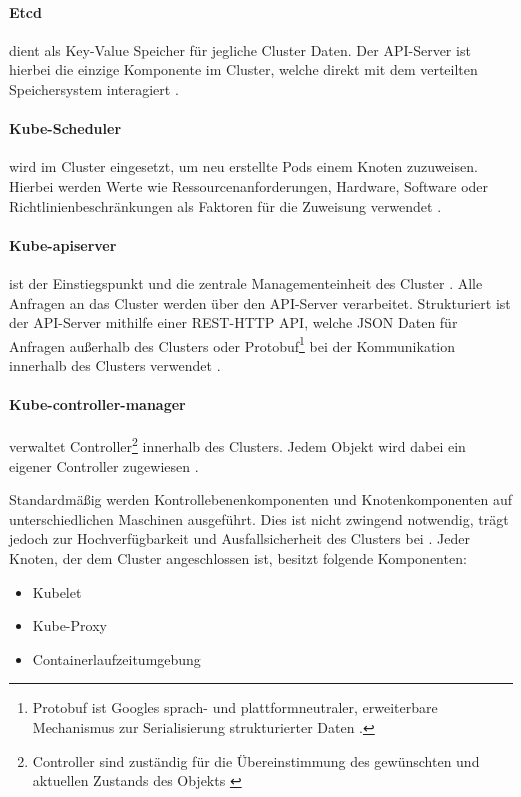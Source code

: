 \paragraph{Etcd} dient als Key-Value Speicher für jegliche Cluster Daten.
Der API-Server ist hierbei die einzige Komponente im Cluster, welche direkt mit dem verteilten Speichersystem interagiert \cite{Hausenblas2019}.

\paragraph{Kube-Scheduler} wird im Cluster eingesetzt, um neu erstellte Pods einem Knoten zuzuweisen.
Hierbei werden Werte wie Ressourcenanforderungen, Hardware, Software oder Richtlinienbeschränkungen 
als Faktoren für die Zuweisung verwendet \cite{kubernetesComponents}.

\paragraph{Kube-apiserver} ist der Einstiegspunkt und die zentrale Managementeinheit des Cluster \cite{Hausenblas2019}. 
Alle Anfragen an das Cluster werden über den API-Server verarbeitet.
Strukturiert ist der API-Server mithilfe einer REST-HTTP API, welche JSON Daten für Anfragen außerhalb des Clusters
oder Protobuf\footnote{Protobuf ist Googles sprach- und plattformneutraler, erweiterbare Mechanismus zur Serialisierung strukturierter Daten \cite{protobuf}.}
bei der Kommunikation innerhalb des Clusters verwendet \cite{Hausenblas2019}.

\paragraph{Kube-controller-manager} verwaltet Controller\footnote{Controller sind zuständig für die Übereinstimmung des gewünschten und aktuellen Zustands des Objekts \cite{kubernetesControllers}} 
innerhalb des Clusters.
Jedem Objekt wird dabei ein eigener Controller zugewiesen \cite{kubernetesControllers}.

\vspace{5mm}
Standardmäßig werden Kontrollebenenkomponenten und Knotenkomponenten auf unterschiedlichen Maschinen ausgeführt.
Dies ist nicht zwingend notwendig, trägt jedoch zur Hochverfügbarkeit und Ausfallsicherheit des Clusters bei \cite{kubernetesComponents}. 
Jeder Knoten, der dem Cluster angeschlossen ist, besitzt folgende Komponenten:
\begin{itemize}
  \item Kubelet
  \item Kube-Proxy
  \item Containerlaufzeitumgebung
\end{itemize}

